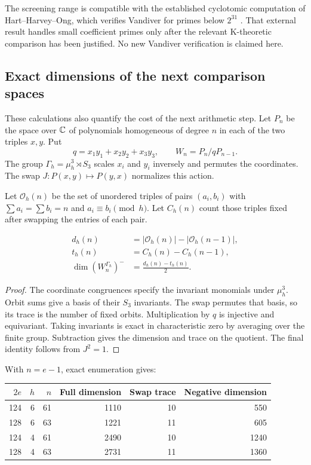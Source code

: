 The screening range is compatible with the established cyclotomic
computation of Hart--Harvey--Ong, which verifies Vandiver for primes
below $2^{31}$ \cite{hho}. That external result handles small
coefficient primes only after the relevant K-theoretic comparison
has been justified. No new Vandiver verification is claimed here.

\subsection{Exact dimensions of the next comparison spaces}

These calculations also quantify the cost of the next arithmetic
step. Let $P_n$ be the space over $\mathbb C$ of polynomials homogeneous
of degree $n$ in each of the two triples $x,y$. Put
\[
 q=x_1y_1+x_2y_2+x_3y_3,\qquad W_n=P_n/qP_{n-1}.
\]
The group $\Gamma_h=\mu_h^3\rtimes S_3$ scales $x_i$ and $y_i$
inversely and permutes the coordinates. The swap
$J:P(x,y)\mapsto P(y,x)$ normalizes this action.

Let $\mathcal O_h(n)$ be the set of unordered triples of pairs
$(a_i,b_i)$ with $\sum a_i=\sum b_i=n$ and
$a_i\equiv b_i\pmod h$. Let $C_h(n)$ count those triples fixed
after swapping the entries of each pair.

\begin{proposition}
\[
 \begin{split}
 d_h(n)&=|\mathcal O_h(n)|-|\mathcal O_h(n-1)|,\\
 t_h(n)&=C_h(n)-C_h(n-1),\\
 \dim(W_n^{\Gamma_h})^-&=\frac{d_h(n)-t_h(n)}2.
 \end{split}
\]
\end{proposition}

\begin{proof}
The coordinate congruences specify the invariant monomials under
$\mu_h^3$. Orbit sums give a basis of their $S_3$ invariants.
The swap permutes that basis, so its trace is the number of fixed
orbits. Multiplication by $q$ is injective and equivariant.
Taking invariants is exact in characteristic zero by averaging
over the finite group. Subtraction gives the dimension and trace
on the quotient. The final identity follows from $J^2=1$.
\end{proof}

With $n=e-1$, exact enumeration gives:

\begin{center}
\begin{tabular}{@{}rrrrrr@{}}
\toprule
$2e$ & $h$ & $n$ & Full dimension & Swap trace & Negative dimension\\
\midrule
124&6&61&1110&10&550\\
128&6&63&1221&11&605\\
124&4&61&2490&10&1240\\
128&4&63&2731&11&1360\\
\bottomrule
\end{tabular}
\end{center}


